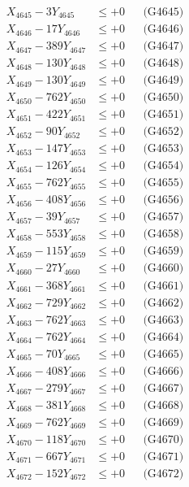 \documentclass[a4paper,10pt]{article}
\begin{document}
{\begin{align}
X_{4645} - 3Y_{4645} &\leq +0 && \text{(G4645)} \\
X_{4646} - 17Y_{4646} &\leq +0 && \text{(G4646)} \\
X_{4647} - 389Y_{4647} &\leq +0 && \text{(G4647)} \\
X_{4648} - 130Y_{4648} &\leq +0 && \text{(G4648)} \\
X_{4649} - 130Y_{4649} &\leq +0 && \text{(G4649)} \\
X_{4650} - 762Y_{4650} &\leq +0 && \text{(G4650)} \\
\allowbreak
X_{4651} - 422Y_{4651} &\leq +0 && \text{(G4651)} \\
X_{4652} - 90Y_{4652} &\leq +0 && \text{(G4652)} \\
X_{4653} - 147Y_{4653} &\leq +0 && \text{(G4653)} \\
X_{4654} - 126Y_{4654} &\leq +0 && \text{(G4654)} \\
X_{4655} - 762Y_{4655} &\leq +0 && \text{(G4655)} \\
X_{4656} - 408Y_{4656} &\leq +0 && \text{(G4656)} \\
X_{4657} - 39Y_{4657} &\leq +0 && \text{(G4657)} \\
X_{4658} - 553Y_{4658} &\leq +0 && \text{(G4658)} \\
X_{4659} - 115Y_{4659} &\leq +0 && \text{(G4659)} \\
X_{4660} - 27Y_{4660} &\leq +0 && \text{(G4660)} \\
\allowbreak
X_{4661} - 368Y_{4661} &\leq +0 && \text{(G4661)} \\
X_{4662} - 729Y_{4662} &\leq +0 && \text{(G4662)} \\
X_{4663} - 762Y_{4663} &\leq +0 && \text{(G4663)} \\
X_{4664} - 762Y_{4664} &\leq +0 && \text{(G4664)} \\
X_{4665} - 70Y_{4665} &\leq +0 && \text{(G4665)} \\
X_{4666} - 408Y_{4666} &\leq +0 && \text{(G4666)} \\
X_{4667} - 279Y_{4667} &\leq +0 && \text{(G4667)} \\
X_{4668} - 381Y_{4668} &\leq +0 && \text{(G4668)} \\
X_{4669} - 762Y_{4669} &\leq +0 && \text{(G4669)} \\
X_{4670} - 118Y_{4670} &\leq +0 && \text{(G4670)} \\
\allowbreak
X_{4671} - 667Y_{4671} &\leq +0 && \text{(G4671)} \\
X_{4672} - 152Y_{4672} &\leq +0 && \text{(G4672)} \\

\end{align}}
\end{document}
